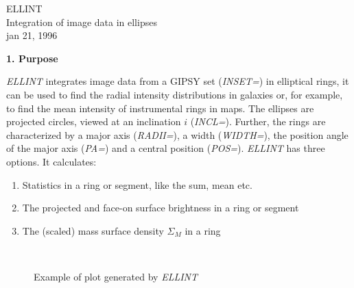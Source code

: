 
%
%
%
%
%
%
%
%

\parskip=0.8cm



\begin{center}
{\Large ELLINT}\\[1.5cm]
{\large Integration of image data in ellipses}\\[1.5cm]
jan 21,  1996
\end{center}


\noindent
{\bf 1. Purpose}

\noindent
{\it ELLINT} integrates image data from a GIPSY set ({\it INSET=}) in 
elliptical rings, 
it can be used to find the radial intensity distributions in galaxies 
or, for example, to find the mean intensity of instrumental rings in maps.
The ellipses are projected circles, viewed at an inclination $i$
({\it INCL=}). Further, the rings are characterized by a major axis
({\it RADII=}), a width ({\it WIDTH=}), the position angle of the major axis
({\it PA=}) and a central position ({\it POS=}).
{\it ELLINT} has three options. It calculates:
\begin{enumerate}
\item Statistics in a ring or segment, like the sum, mean etc.
\item The projected and face-on surface brightness in a ring or segment
\item The (scaled) mass surface density $\Sigma_M$ in a ring
\end{enumerate}



\begin{figure}
\begin{center}
\leavevmode
\hbox{%
\epsfxsize=2.0in
}
\caption{Example of plot generated by {\it ELLINT}}
\end{center}
\end{figure}




